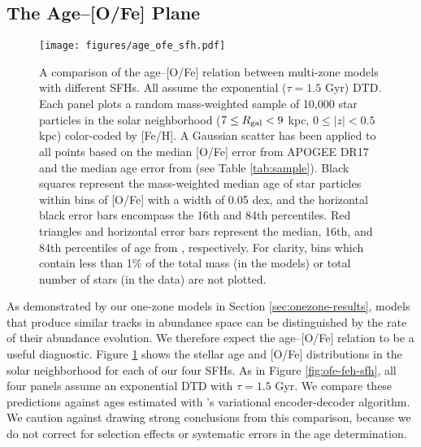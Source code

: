 \documentclass[twocolumn,twocolappendix,linenumbers]{aastex631}
\begin{document}
\subsection{The Age--[O/Fe] Plane}
\label{sec:age-ofe}

\begin{figure}
    \centering
    \texttt{[image: figures/age\_ofe\_sfh.pdf]}
    \caption{A comparison of the age--[O/Fe] relation between multi-zone models with different SFHs. All assume the exponential ($\tau=1.5$ Gyr) DTD. Each panel plots a random mass-weighted sample of 10,000 star particles in the solar neighborhood ($7\leq R_{\rm gal}<9$ kpc, $0\leq|z|<0.5$ kpc) color-coded by [Fe/H]. A Gaussian scatter has been applied to all points based on the median [O/Fe] error from APOGEE DR17 and the median age error from  (see Table \ref{tab:sample}). Black squares represent the mass-weighted median age of star particles within bins of [O/Fe] with a width of 0.05 dex, and the horizontal black error bars encompass the 16th and 84th percentiles. Red triangles and horizontal error bars represent the median, 16th, and 84th percentiles of age from , respectively. For clarity, bins which contain less than 1\% of the total mass (in the models) or total number of stars (in the data) are not plotted.}
    \label{fig:age-ofe-sfh}
\end{figure}

As demonstrated by our one-zone models in Section \ref{sec:onezone-results}, models that produce similar tracks in abundance space can be distinguished by the rate of their abundance evolution. We therefore expect the age--[O/Fe] relation to be a useful diagnostic.
Figure \ref{fig:age-ofe-sfh} shows the stellar age and [O/Fe] distributions in the solar neighborhood for each of our four SFHs. As in Figure \ref{fig:ofe-feh-sfh}, all four panels assume an exponential DTD with $\tau=1.5$ Gyr. We compare these predictions against ages estimated with 's variational encoder-decoder algorithm.
We caution against drawing strong conclusions from this comparison, because we do not correct for selection effects or systematic errors in the age determination. 
\end{document}
